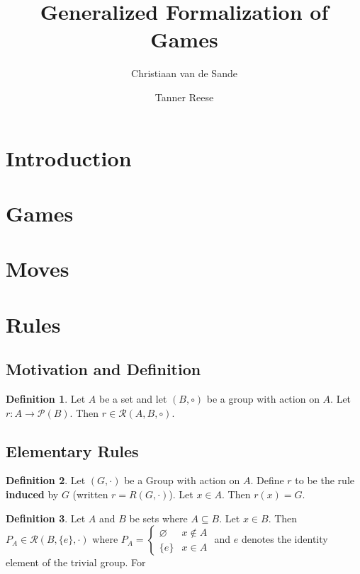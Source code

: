\documentclass{article}
\title{Generalized Formalization of Games}
\author{Christiaan van de Sande \and Tanner Reese}
\theoremstyle{definition}
\newtheorem{definition}{Definition}[subsection]
\theoremstyle{plain}
\def\Rule{\mathcal{R}}
\begin{document}
\maketitle

\section{Introduction}

\section{Games}

\section{Moves}

\section{Rules}

\subsection{Motivation and Definition} %

\begin{definition}
  Let $ A $ be a set and
  let $ (B, \circ) $ be a group with action on $ A $.
  Let $ r : A \rightarrow \mathcal{P} (B) $.
  Then $ r \in \Rule (A, B, \circ) $. 
\end{definition}

\subsection{Elementary Rules} %

\begin{definition}
  Let $ (G, \cdot) $ be a Group with action on $ A $.
  Define $ r $ to be the rule \textbf{induced} by $ G $
  (written $ r = R (G, \cdot) $).
  Let $ x \in A $.
  Then $ r (x) = G $.
\end{definition}

\begin{definition}
  Let $ A $ and $ B $ be sets where $ A \subseteq B $.
  Let $ x \in B $.
  Then $ P_A \in \Rule (B, \{ e \}, \cdot) $
  where $ P_A = \begin{cases} \varnothing & x \notin A \\ \{ e \} & x \in A \end{cases} $
    and $ e $ denotes the identity element of the trivial group.
  For 
\end{definition}
\end{document}
